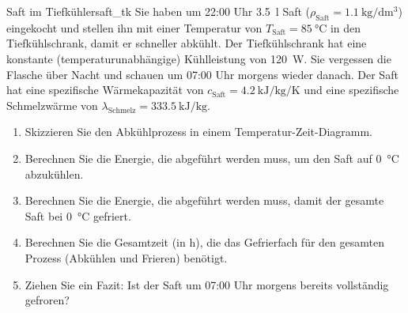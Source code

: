 \documentclass[ngerman]{scrreprt}
\begin{document}
\begin{aufgabebox}{Saft im Tiefkühler}{saft_tk}
Sie haben um 22:00 Uhr \SI{3.5}{\litre} Saft ($\rho_{\text{Saft}}=\SI{1.1}{\kilogram\per\deci\metre\cubed}$) eingekocht und stellen ihn mit einer Temperatur von $T_{\text{Saft}}=\SI{85}{\degreeCelsius}$ in den Tiefkühlschrank, damit er schneller abkühlt. Der Tiefkühlschrank hat eine konstante (temperaturunabhängige) Kühlleistung von \SI{120}{\watt}. Sie vergessen die Flasche über Nacht und schauen um 07:00 Uhr morgens wieder danach.
Der Saft hat eine spezifische Wärmekapazität von $c_{\text{Saft}}=\SI{4.2}{\kilo\joule\per\kilogram\per\kelvin}$ und eine spezifische Schmelzwärme von $\lambda_{\text{Schmelz}}=\SI{333.5}{\kilo\joule\per\kilogram}$.
\begin{enumerate}
    \item Skizzieren Sie den Abkühlprozess in einem Temperatur-Zeit-Diagramm.
    \item Berechnen Sie die Energie, die abgeführt werden muss, um den Saft auf \SI{0}{\degreeCelsius} abzukühlen.
    \item Berechnen Sie die Energie, die abgeführt werden muss, damit der gesamte Saft bei \SI{0}{\degreeCelsius} gefriert.
    \item Berechnen Sie die Gesamtzeit (in \si{\hour}), die das Gefrierfach für den gesamten Prozess (Abkühlen und Frieren) benötigt.
    \item Ziehen Sie ein Fazit: Ist der Saft um 07:00 Uhr morgens bereits vollständig gefroren?
\end{enumerate}
\end{aufgabebox}
\end{document}
